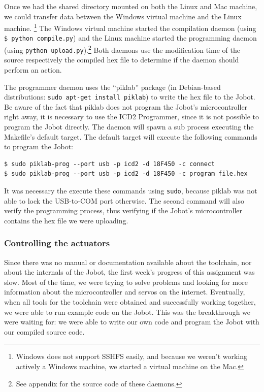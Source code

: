 \documentclass[a4paper,10pt]{article} %
\begin{document}
Once we had the shared directory mounted on both the Linux and Mac machine, we
could transfer data between the Windows virtual machine and the Linux machine.
\footnote{Windows does not support SSHFS easily, and because we weren't working
actively a Windows machine, we started a virtual machine on the Mac.} The
Windows virtual machine started the compilation daemon (using \texttt{\$ python
compile.py}) and the Linux machine started the programming daemon (using
\texttt{python upload.py}).\footnote{See appendix for the source code of these
daemons.} Both daemons use the modification time of the source respectively the
compiled hex file to determine if the daemon should perform an action.

The programmer daemon uses the ``piklab'' package (in Debian-based
distributions: \texttt{sudo apt-get install piklab}) to write the hex file to
the Jobot. Be aware of the fact that piklab does not program the Jobot's
microcontroller right away, it is necessary to use the ICD2 Programmer, since
it is not possible to program the Jobot directly. The daemon will spawn a
sub process executing the Makefile's default target. The default target will
execute the following commands to program the Jobot:

\begin{verbatim}
$ sudo piklab-prog --port usb -p icd2 -d 18F450 -c connect
$ sudo piklab-prog --port usb -p icd2 -d 18F450 -c program file.hex
\end{verbatim}

It was necessary the execute these commands using \texttt{sudo}, because
piklab was not able to lock the USB-to-COM port otherwise. The second command
will also verify the programming process, thus verifying if the Jobot's
microcontroller contains the hex file we were uploading.


\subsubsection{Controlling the actuators} %
\label{sub:Cobot implementation}

Since there was no manual or documentation available about the toolchain, nor
about the internals of the Jobot, the first week's progress of this assignment
was slow. Most of the time, we were trying to solve problems and looking for
more information about the microcontroller and servos on the internet.
Eventually, when all tools for the toolchain were obtained and successfully
working together, we were able to run example code on the Jobot. This was the
breakthrough we were waiting for: we were able to write our own code and program
the Jobot with our compiled source code.
\end{document}
